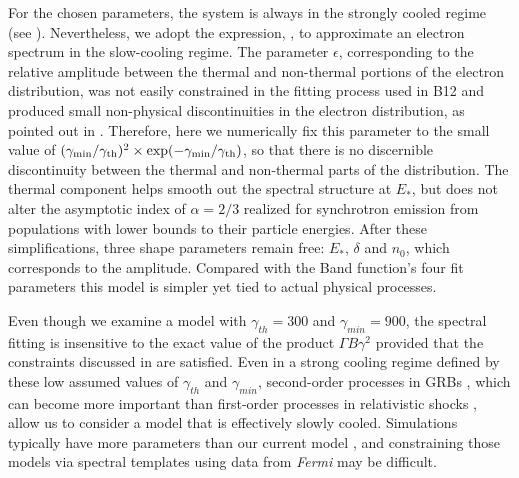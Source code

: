 For the chosen parameters, the system is always in the strongly cooled
regime (see ). Nevertheless, we adopt the expression,
, to approximate an electron spectrum in the
slow-cooling regime.  The parameter $\epsilon$, corresponding to the
relative amplitude between the thermal and non-thermal portions of the
electron distribution, was not easily constrained in the fitting
process used in B12 and produced small non-physical discontinuities in
the electron distribution, as pointed out in
\cite{Beloborodov:2012}. Therefore, here we numerically fix this
parameter to the small value of $(\gamma_{\rm min}/\gamma_{\rm th})^2\times
\exp(-\gamma_{\rm min}/\gamma_{\rm th})$, so that there is no discernible
discontinuity between the thermal and non-thermal parts of the
distribution. The thermal component helps smooth out the spectral
structure at $E_{\ast}$, but does not alter the asymptotic index of
$\alpha = 2/3$ realized for synchrotron emission from populations with
lower bounds to their particle energies. After these simplifications,
three shape parameters remain free: $E_{*}$, $\delta$ and $n_0$, which
corresponds to the amplitude. Compared with the Band function's four
fit parameters this model is simpler yet tied to actual physical
processes.


Even though we examine a model with $\gamma_{th} = 300$ and
$\gamma_{min} = 900$, the spectral fitting is insensitive to the exact
value of the product $\Gamma B\gamma^2$ provided that the constraints
discussed in  are satisfied. Even in a strong cooling regime
defined by these low assumed values of $\gamma_{th}$ and $\gamma_{min}
$, second-order processes in GRBs \cite{Waxman:1995,Dermer:2001},
which can become more important than first-order processes in
relativistic shocks \cite{2009herb.book.....D}, allow us to consider a
model that is effectively slowly cooled. Simulations typically have
more parameters than our current model
\cite{Peer:2004,Asano:2009,Daigne:2009}, and constraining those models
via spectral templates using data from {\it Fermi} may be difficult.



